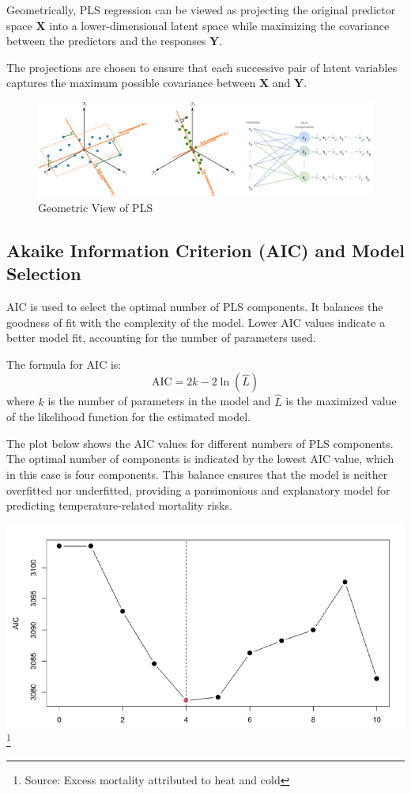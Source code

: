 \documentclass[
]{krantz}
\begin{document}
Geometrically, PLS regression can be viewed as projecting the original predictor space \(\mathbf{X}\) into a lower-dimensional latent space while maximizing the covariance between the predictors and the responses \(\mathbf{Y}\).

The projections are chosen to ensure that each successive pair of latent variables captures the maximum possible covariance between \(\mathbf{X}\) and \(\mathbf{Y}\).

\begin{figure}
\centering
\includegraphics{work/09-epidemiologic/figures/Bild9.png}
\caption{Geometric View of PLS}
\end{figure}

\subsection{Akaike Information Criterion (AIC) and Model Selection}\label{akaike-information-criterion-aic-and-model-selection}

AIC is used to select the optimal number of PLS components. It balances the goodness of fit with the complexity of the model. Lower AIC values indicate a better model fit, accounting for the number of parameters used.

The formula for AIC is:
\[
\text{AIC} = 2k - 2\ln(\hat{L})
\]
where \(k\) is the number of parameters in the model and \(\hat{L}\) is the maximized value of the likelihood function for the estimated model.

The plot below shows the AIC values for different numbers of PLS components. The optimal number of components is indicated by the lowest AIC value, which in this case is four components. This balance ensures that the model is neither overfitted nor underfitted, providing a parsimonious and explanatory model for predicting temperature-related mortality risks.

\includegraphics{work/09-epidemiologic/figures/Bild12.png} \footnote{Source: Excess mortality attributed to heat and cold}
\end{document}
